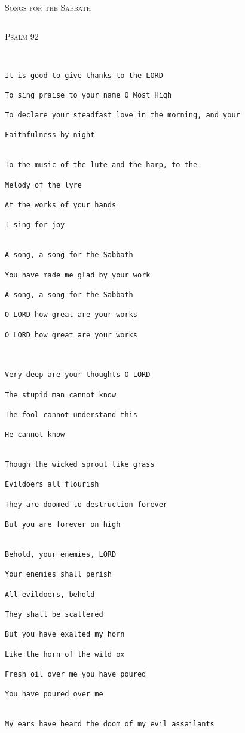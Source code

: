 \documentclass[10pt,oneside,footinclude=true,headinclude=true]{scrbook} %
\makeatletter
\newcommand{\verbatimfont}[1]{\renewcommand{\verbatim@font}{#1}}
\newcommand\songtitle[1]{
	\hspace*{-3.7mm}\Large\textsc{#1}
}
\makeatother
\begin{document}
\verbatimfont{\rmfamily\normalsize}

\songtitle{Songs for the Sabbath}

\begin{verbatim}
\end{verbatim}

\songtitle{Psalm 92}
\begin{verbatim}


It is good to give thanks to the LORD

To sing praise to your name O Most High

To declare your steadfast love in the morning, and your

Faithfulness by night


To the music of the lute and the harp, to the

Melody of the lyre

At the works of your hands

I sing for joy


A song, a song for the Sabbath

You have made me glad by your work

A song, a song for the Sabbath

O LORD how great are your works

O LORD how great are your works



Very deep are your thoughts O LORD

The stupid man cannot know

The fool cannot understand this

He cannot know


Though the wicked sprout like grass

Evildoers all flourish

They are doomed to destruction forever

But you are forever on high


Behold, your enemies, LORD

Your enemies shall perish

All evildoers, behold

They shall be scattered

But you have exalted my horn

Like the horn of the wild ox

Fresh oil over me you have poured

You have poured over me


My ears have heard the doom of my evil assailants


\end{verbatim}
\end{document}
